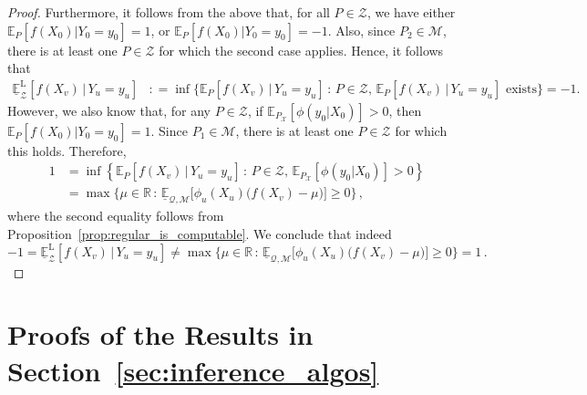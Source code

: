 \documentclass[twoside,11pt]{article}
\newcommand{\reals}{\mathbb{R}}
\newcommand{\states}{\mathcal{X}}
\newcommand{\lexp}{\underline{\mathbb{E}}_{\rateset,\mathcal{M}}}
\newcommand{\rateset}{\mathcal{Q}}
\newcommand{\coloneqq}{:\!=}
\begin{document}
\begin{proof}
Furthermore, it follows from the above that, for all $P\in\mathcal{Z}$, we have either $\mathbb{E}_P[f(X_0)\vert Y_0=y_0]=1$, or $\mathbb{E}_P[f(X_0)\vert Y_0=y_0]=-1$. Also, since $P_2\in\mathcal{M}$, there is at least one $P\in\mathcal{Z}$ for which the second case applies. Hence, it follows that
\begin{align*}
\underline{\mathbb{E}}_\mathcal{Z}^\mathrm{L}[f(X_v)\,\vert\, Y_u=y_u] &\coloneqq \inf\bigl\{\mathbb{E}_P[f(X_v)\,\vert\,Y_u=y_u]\,:\,P\in\mathcal{Z},\,\text{$\mathbb{E}_P[f(X_v)\,\vert\,Y_u=y_u]$ exists}\bigr\}= -1.
\end{align*}
However, we also know that, for any $P\in\mathcal{Z}$, if $\mathbb{E}_{P_\states}[\phi(y_0\vert X_0)]>0$, then $\mathbb{E}_{P}[f(X_0)\vert Y_0=y_0]=1$. Since $P_1\in\mathcal{M}$, there is at least one $P\in\mathcal{Z}$ for which this holds. Therefore,
\begin{align*}
1 &= \inf\left\{\mathbb{E}_P[f(X_v)\,\vert\,Y_u=y_u]\,:\,P\in\mathcal{Z},\,\mathbb{E}_{P_\states}[\phi(y_0\vert X_0)]>0\right\} \\
 &= \max\{\mu\in\reals\,:\,\lexp\bigl[\phi_u(X_u)\bigl(f(X_v)-\mu\bigr)\bigr]\geq 0\}\,,
\end{align*}
where the second equality follows from Proposition~\ref{prop:regular_is_computable}. We conclude that indeed
\begin{equation*}
-1 = \underline{\mathbb{E}}_\mathcal{Z}^\mathrm{L}[f(X_v)\,\vert\, Y_u=y_u] \neq 
\max\{\mu\in\reals\,:\,\lexp\bigl[\phi_u(X_u)\bigl(f(X_v)-\mu\bigr)\bigr]\geq 0\} = 1\,.
\end{equation*}
\end{proof}



\section{Proofs of the Results in Section~\ref{sec:inference_algos}}
\end{document}

